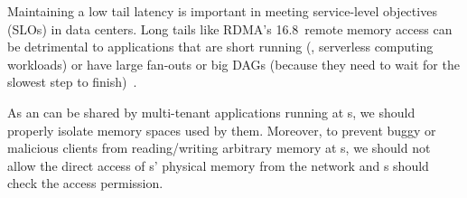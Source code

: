 Maintaining a low tail latency is important in meeting service-level objectives (SLOs) in data centers.
Long tails like RDMA's 16.8\ms\ remote memory access can be detrimental to applications that are short running (\eg, serverless computing workloads) or have large fan-outs or big DAGs
(because they need to wait for the slowest step to finish)~\cite{taillatency}.

As an \MN{} can be shared by multi-tenant applications running at \CN{}s, %
we should properly isolate memory spaces used by them.
Moreover, to prevent buggy or malicious clients from reading/writing arbitrary memory at \MN{}s, we should not allow the direct access of \MN{}s' physical memory from the network and \MN{}s should check the access permission.

